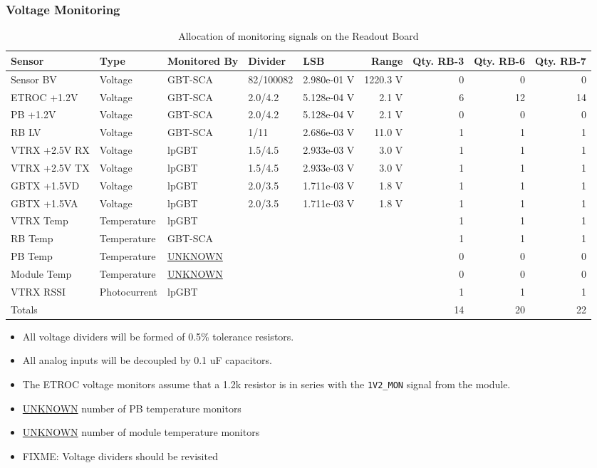\documentclass[11pt]{article}
\begin{document}
\subsubsection{Voltage Monitoring}
\label{sec:org2a5f446}
\begin{sidewaystable}[htbp]
\caption{Allocation of monitoring signals on the Readout Board}
\centering
\begin{tabular}{lllllrrrr}
Sensor & Type & Monitored By & Divider & LSB & Range & Qty. RB-3 & Qty. RB-6 & Qty. RB-7\\
\hline
Sensor BV & Voltage & GBT-SCA & 82/100082 & 2.980e-01 V & 1220.3 V & 0 & 0 & 0\\
ETROC +1.2V & Voltage & GBT-SCA & 2.0/4.2 & 5.128e-04 V & 2.1 V & 6 & 12 & 14\\
PB +1.2V & Voltage & GBT-SCA & 2.0/4.2 & 5.128e-04 V & 2.1 V & 0 & 0 & 0\\
RB LV & Voltage & GBT-SCA & 1/11 & 2.686e-03 V & 11.0 V & 1 & 1 & 1\\
VTRX +2.5V RX & Voltage & lpGBT & 1.5/4.5 & 2.933e-03 V & 3.0 V & 1 & 1 & 1\\
VTRX +2.5V TX & Voltage & lpGBT & 1.5/4.5 & 2.933e-03 V & 3.0 V & 1 & 1 & 1\\
GBTX +1.5VD & Voltage & lpGBT & 2.0/3.5 & 1.711e-03 V & 1.8 V & 1 & 1 & 1\\
GBTX +1.5VA & Voltage & lpGBT & 2.0/3.5 & 1.711e-03 V & 1.8 V & 1 & 1 & 1\\
VTRX Temp & Temperature & lpGBT &  &  &  & 1 & 1 & 1\\
RB Temp & Temperature & GBT-SCA &  &  &  & 1 & 1 & 1\\
PB Temp & Temperature & \uline{UNKNOWN} &  &  &  & 0 & 0 & 0\\
Module Temp & Temperature & \uline{UNKNOWN} &  &  &  & 0 & 0 & 0\\
VTRX RSSI & Photocurrent & lpGBT &  &  &  & 1 & 1 & 1\\
\hline
Totals &  &  &  &  &  & 14 & 20 & 22\\
\end{tabular}
\end{sidewaystable}
\begin{itemize}
\item All voltage dividers will be formed of 0.5\% tolerance resistors.
\item All analog inputs will be decoupled by 0.1 uF capacitors.
\item The ETROC voltage monitors assume that a 1.2k resistor is in series with the \texttt{1V2\_MON} signal from the module.
\item \uline{UNKNOWN} number of PB temperature monitors
\item \uline{UNKNOWN} number of module temperature monitors
\item FIXME:  Voltage dividers should be revisited
\end{itemize}
\end{document}
